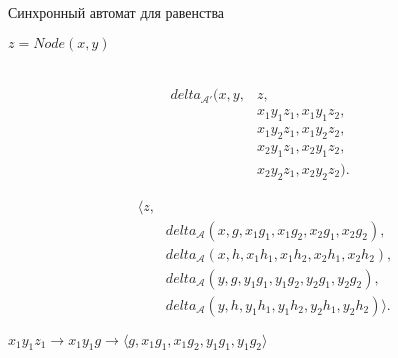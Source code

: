 \documentclass{beamer}
\newcommand{\aut}{\mathcal{A}}
\begin{document}
\begin{frame}{Синхронный автомат для равенства}
\begin{minipage}{1\linewidth}
$z = Node(x, y)$\\
\\
\PattternAutomata
\end{minipage}
\begin{minipage}{0.4\linewidth}
\vspace{1em}
\begin{align*}
    delta_{\aut'} (x, y,& z, \\
    & x_1y_1z_1, x_1y_1z_2, \\
    & x_1y_2z_1, x_1y_2z_2, \\
    & x_2y_1z_1, x_2y_1z_2, \\
    & x_2y_2z_1, x_2y_2z_2).
\end{align*}
\end{minipage}
\begin{minipage}{0.4\linewidth}
\vspace{1em}
\begin{align*}
    &\langle z, \\
    &\qquad delta_{\aut}(x, g, x_1g_1, x_1g_2, x_2g_1, x_2g_2), \\
    &\qquad delta_{\aut}(x, h, x_1h_1, x_1h_2, x_2h_1, x_2h_2), \\
    &\qquad delta_{\aut}(y, g, y_1g_1, y_1g_2, y_2g_1, y_2g_2), \\
    &\qquad delta_{\aut}(y, h, y_1h_1, y_1h_2, y_2h_1, y_2h_2) \rangle.
\end{align*}
\end{minipage}

\pause
\begin{minipage}{1\linewidth}
\vspace{1em}
$x_1y_1z_1 \to x_1y_1g \to \langle g, x_1g_1, x_1g_2, y_1g_1, y_1g_2 \rangle$
\end{minipage}
\end{frame}


\end{document}
